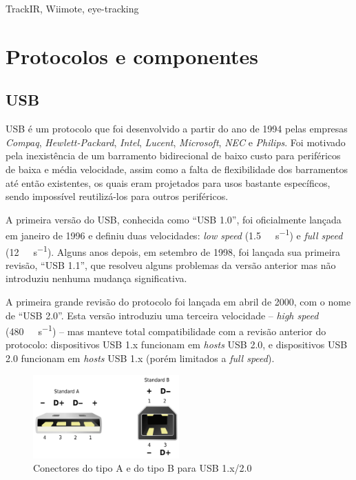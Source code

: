 \documentclass[brazil,pagestart=firstchapter]{abnt}
\begin{document}
TrackIR, Wiimote, eye-tracking


\chapter{Protocolos e componentes\label{cap:protocolos_e_componentes}}

\section{USB\label{sec:usb}}

\ac{USB} é um protocolo que foi desenvolvido a partir do ano de 1994 pelas
empresas \textit{Compaq}, \textit{Hewlett-Packard}, \textit{Intel},
\textit{Lucent}, \textit{Microsoft}, \textit{NEC} e \textit{Philips}. Foi
motivado pela inexistência de um barramento bidirecional de baixo custo para
periféricos de baixa e média velocidade, assim como a falta de flexibilidade
dos barramentos até então existentes, os quais eram projetados para usos
bastante específicos, sendo impossível reutilizá-los para outros
periféricos. \cite{usb20}

A primeira versão do \ac{USB}, conhecida como ``USB 1.0'', foi oficialmente
lançada em janeiro de 1996 e definiu duas velocidades: \textit{low speed}
(\SI{1.5}{\mega\bit\per\second}) e \textit{full speed}
(\SI{12}{\mega\bit\per\second}). Alguns anos depois, em setembro de 1998, foi
lançada sua primeira revisão, ``USB 1.1'', que resolveu alguns problemas da
versão anterior mas não introduziu nenhuma mudança significativa.

A primeira grande revisão do protocolo foi lançada em abril de 2000, com o
nome de ``USB 2.0''. Esta versão introduziu uma terceira velocidade --
\textit{high speed} (\SI{480}{\mega\bit\per\second}) -- mas manteve total
compatibilidade com a revisão anterior do protocolo: dispositivos USB 1.x
funcionam em \textit{hosts} USB 2.0, e dispositivos USB 2.0 funcionam em
\textit{hosts} USB 1.x (porém limitados a \textit{full speed}).

\begin{figure}[h]
\centering
\includegraphics[width=0.5\textwidth]{img/USB.png}
\caption{Conectores do tipo A e do tipo B para USB 1.x/2.0}
\label{fig:usb_connectors}
\end{figure}
\end{document}
